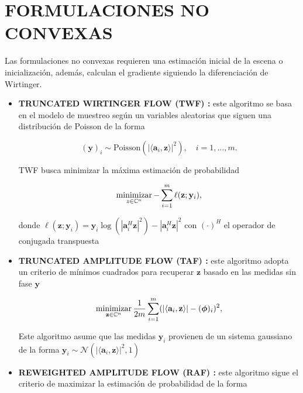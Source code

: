 \section{FORMULACIONES NO CONVEXAS}
Las formulaciones no convexas requieren una estimación inicial de la escena o inicialización, además, calculan el gradiente siguiendo la diferenciación de Wirtinger.
\begin{itemize}
    \item \textbf{TRUNCATED WIRTINGER FLOW (TWF) :} este algoritmo se basa en el modelo de muestreo según un variables aleatorias que siguen una distribución de Poisson de la forma
    
    \begin{equation}
        (\mathbf{y})_i\sim \mathrm{Poisson}( \vert \langle \mathbf{a}_i,\mathbf{z}\rangle \vert^2 ), \quad i=1,\dots,m.
    \end{equation}
    
    TWF busca minimizar la máxima estimación de probabilidad 
    
    \begin{equation}
        \operatorname*{minimizar}_{z \in \mathbb{C}^{n}} - \sum_{i=1}^{m} \ell(\mathbf{z};\mathbf{y}_i),
    \end{equation}
    
    donde $\ell(\mathbf{z};\mathbf{y}_i) = { \mathbf{y}_i\log(|\mathbf{a}_i^H \mathbf{z}|^2) -|\mathbf{a}_i^H \mathbf{z}|^2 }$ con $(\cdot)^H$ el operador de conjugada transpuesta
    
    \item \textbf{TRUNCATED AMPLITUDE FLOW (TAF) :} este algoritmo adopta un criterio de mínimos cuadrados para recuperar $\mathbf{z}$ basado en las medidas sin fase $\mathbf{y}$ 
    
    \begin{equation}
        \operatorname*{minimizar}_{\mathbf{z} \in \mathbb{C}^{n}} \frac{1}{2m} \sum_{i=1}^{m} (\vert \langle \mathbf{a}_i,\mathbf{z}\rangle \vert - (\boldsymbol{\phi})_i)^2,
    \end{equation}
    
    Este algoritmo asume que las medidas $\mathbf{y}_i$ provienen de un sistema gaussiano de la forma $\mathbf{y}_i \sim \mathcal{N}(\vert \langle \mathbf{a}_i,\mathbf{z}\rangle \vert^2, 1)$
    
    \item \textbf{REWEIGHTED AMPLITUDE FLOW (RAF) :} este algoritmo sigue el criterio de maximizar la estimación de probabilidad de la forma
    

\end{itemize}
